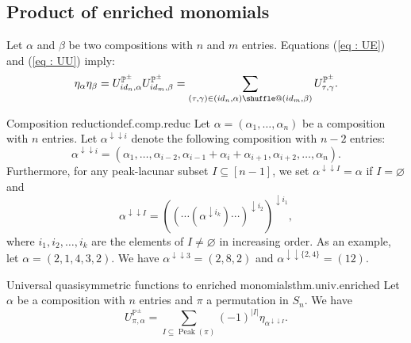\documentclass[numbers=enddot,12pt,final,onecolumn,notitlepage]{scrartcl}%
\makeatletter
\newcommand{\al}{\alpha}
\newcommand{\PP}{\mathbb{P}} %
\newcommand{\Peak}{\operatorname{Peak}}
\providecommand*{\shuffle}{%
  \mathbin{\mathpalette\shuffle@{}}%
}
\newcommand*{\shuffle@}[2]{%
  \sbox0{$#1\vcenter{}$}%
  \kern .15\ht0 %
  \rlap{\vrule height .25\ht0 depth 0pt width 2.5\ht0}%
  \raise.1\ht0\hbox to 2.5\ht0{%
    \vrule height 1.75\ht0 depth -.1\ht0 width .17\ht0 %
    \hfill
    \vrule height 1.75\ht0 depth -.1\ht0 width .17\ht0 %
    \hfill
    \vrule height 1.75\ht0 depth -.1\ht0 width .17\ht0 %
  }%
  \kern .15\ht0 %
}
\newcommand{\0}{\phantom{c}}
\let\sumnonlimits\sum
\renewcommand{\sum}{\sumnonlimits\limits}
\makeatother
\begin{document}
\subsection{Product of  enriched monomials}
Let $\alpha$ and $\beta$ be two compositions with $n$ and $m$ entries. Equations (\ref{eq : UE}) and (\ref{eq : UU}) imply:
\begin{align}
\label{eq : MME}
\eta_\al \eta_\beta = U^{\PP^\pm}_{id_{n},\alpha}U^{\PP^\pm}_{id_{m},\beta}=\sum_{(\tau,\gamma)\in(id_{n},\alpha)\shuffle(id_{m},\beta)}U^{\mathcal{\PP^\pm}}_{\tau,\gamma} .
\end{align}
\begin{definition}{Composition reduction}{def.comp.reduc}
Let $\al = (\al_1, \dots, \al_n)$ be a composition with $n$ entries. Let $\al^{\downarrow\downarrow i}$ denote the following composition with $n-2$ entries:
\begin{equation*}
\al^{\downarrow\downarrow i} = (\al_1, \dots, \al_{i-2},{\al_{i-1}+\al_i+\al_{i+1}},\al_{i+2},\dots ,\al_n) .
\end{equation*}  
Furthermore, for any peak-lacunar subset $I\subseteq [n-1]$, we set $\al^{\downarrow\downarrow I}= \al$ if $I=\varnothing$ and
\[
\al^{\downarrow\downarrow I}
= \left( \left( \cdots \left( \al^{\downarrow i_k} \right) \cdots \right)^{\downarrow i_2} \right)^{\downarrow i_1} ,
\]
where $i_1, i_2, \ldots, i_k$ are the elements of $I \neq \varnothing$ in increasing order.
As an example, let $\al = (2,1,4,3,2)$. We have $\al^{\downarrow\downarrow 3} = (2,8,2)$ and $\al^{\downarrow \downarrow\{2,4\}} = (12).$

\end{definition}
%
\begin{theorem}{Universal quasisymmetric functions to enriched monomials}{thm.univ.enriched}
Let $\alpha$ be a composition with $n$ entries and $\pi$ a permutation in $S_n$. We have
\begin{equation}
\label{eq : U as sum}
U^{\PP^\pm}_{\pi,\al} = \sum_{I \subseteq \Peak(\pi)}(-1)^{|I|}\eta_{\al^{\downarrow\downarrow I}} .
\end{equation}
\end{theorem}
\end{document}
